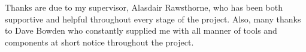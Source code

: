 Thanks are due to my supervisor, Alasdair Rawsthorne, who has been both
supportive and helpful throughout every stage of the project. Also, many thanks
to Dave Bowden who constantly supplied me with all manner of tools and
components at short notice throughout the project.
